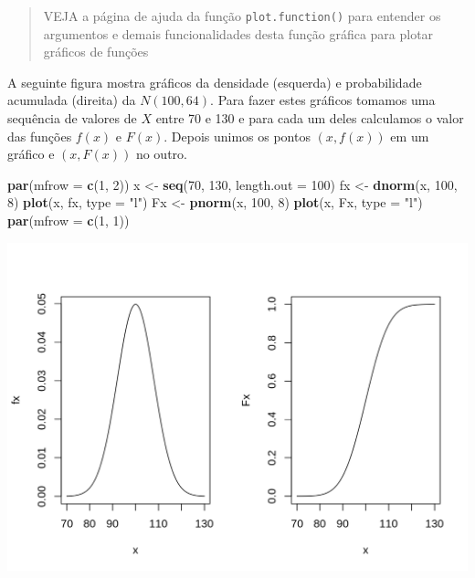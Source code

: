 \documentclass[10pt,a4paper]{book}
\newenvironment{Shaded}{\begin{snugshade}}{\end{snugshade}}
\newcommand{\KeywordTok}[1]{\textcolor[rgb]{0.13,0.29,0.53}{\textbf{#1}}}
\newcommand{\DataTypeTok}[1]{\textcolor[rgb]{0.13,0.29,0.53}{#1}}
\newcommand{\DecValTok}[1]{\textcolor[rgb]{0.00,0.00,0.81}{#1}}
\newcommand{\StringTok}[1]{\textcolor[rgb]{0.31,0.60,0.02}{#1}}
\newcommand{\NormalTok}[1]{#1}
\begin{document}
\begin{quote}
VEJA a página de ajuda da função \texttt{plot.function()} para entender
os argumentos e demais funcionalidades desta função gráfica para plotar
gráficos de funções
\end{quote}

A seguinte figura mostra gráficos da densidade (esquerda) e
probabilidade acumulada (direita) da \(N(100, 64)\). Para fazer estes
gráficos tomamos uma sequência de valores de \(X\) entre 70 e 130 e para
cada um deles calculamos o valor das funções \(f(x)\) e \(F(x)\). Depois
unimos os pontos \((x,f(x))\) em um gráfico e \((x,F(x))\) no outro.

\begin{Shaded}
\begin{Highlighting}[]
\KeywordTok{par}\NormalTok{(}\DataTypeTok{mfrow =} \KeywordTok{c}\NormalTok{(}\DecValTok{1}\NormalTok{, }\DecValTok{2}\NormalTok{))}
\NormalTok{x <-}\StringTok{ }\KeywordTok{seq}\NormalTok{(}\DecValTok{70}\NormalTok{, }\DecValTok{130}\NormalTok{, }\DataTypeTok{length.out =} \DecValTok{100}\NormalTok{)}
\NormalTok{fx <-}\StringTok{ }\KeywordTok{dnorm}\NormalTok{(x, }\DecValTok{100}\NormalTok{, }\DecValTok{8}\NormalTok{)}
\KeywordTok{plot}\NormalTok{(x, fx, }\DataTypeTok{type =} \StringTok{"l"}\NormalTok{)}
\NormalTok{Fx <-}\StringTok{ }\KeywordTok{pnorm}\NormalTok{(x, }\DecValTok{100}\NormalTok{, }\DecValTok{8}\NormalTok{)}
\KeywordTok{plot}\NormalTok{(x, Fx, }\DataTypeTok{type =} \StringTok{"l"}\NormalTok{)}
\KeywordTok{par}\NormalTok{(}\DataTypeTok{mfrow =} \KeywordTok{c}\NormalTok{(}\DecValTok{1}\NormalTok{, }\DecValTok{1}\NormalTok{))}
\end{Highlighting}
\end{Shaded}

\begin{center}\includegraphics{figures/unnamed-chunk-342-1} \end{center}
\end{document}
